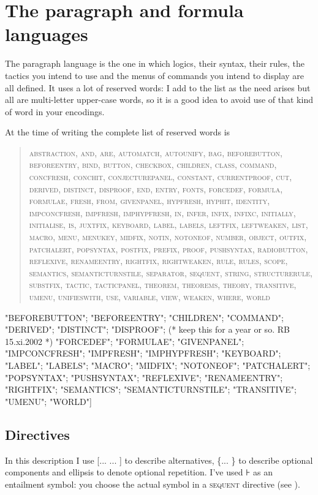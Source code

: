 \chapter{The paragraph and formula languages}
\label{appx:paraformlang}


The paragraph language is the one in which logics, their syntax, their rules, the tactics you intend to use and the menus of commands you intend to display are all defined. It uses a lot of reserved words: I add to the list as the need arises but all are multi-letter upper-case words, so it is a good idea to avoid use of that kind of word in your encodings.

At the time of writing the complete list of reserved words is
\begin{quote}
\textsc{abstraction, and, are, automatch, autounify, bag, beforebutton, beforeentry, bind, button, checkbox, children, class, command, concfresh, conchit, conjecturepanel, constant, currentproof, cut, derived, distinct, disproof, end, entry, fonts, forcedef, formula, formulae, fresh, from, givenpanel, hypfresh, hyphit, identity, impconcfresh, impfresh, imphypfresh, in, infer, infix, infixc, initially, initialise, is, juxtfix, keyboard, label, labels, leftfix, leftweaken, list, macro, menu, menukey, midfix, notin, notoneof, number, object, outfix, patchalert, popsyntax, postfix, prefix, proof, pushsyntax, radiobutton, reflexive, renameentry, rightfix, rightweaken, rule, rules, scope, semantics, semanticturnstile, separator, sequent, string, structurerule, substfix, tactic, tacticpanel, theorem, theorems, theory, transitive, umenu, unifieswith, use, variable, view, weaken, where, world}
\end{quote}

 
     "BEFOREBUTTON"; "BEFOREENTRY";  
     "CHILDREN"; "COMMAND";
     "DERIVED"; "DISTINCT"; "DISPROOF"; (* keep this for a year or so. RB 15.xi.2002 *)
     "FORCEDEF"; "FORMULAE"; 
     "GIVENPANEL"; 
     "IMPCONCFRESH"; "IMPFRESH"; "IMPHYPFRESH";  
     "KEYBOARD"; 
     "LABEL"; "LABELS"; 
     "MACRO"; "MIDFIX"; 
     "NOTONEOF"; 
     "PATCHALERT"; "POPSYNTAX"; "PUSHSYNTAX";
     "REFLEXIVE"; "RENAMEENTRY"; "RIGHTFIX";  
     "SEMANTICS"; "SEMANTICTURNSTILE"; "TRANSITIVE"; 
     "UMENU"; "WORLD"]

\section{Directives}

In this description I use [... {\textbar}... ] to describe alternatives, \{... \} to describe optional components and ellipsis to denote optional repetition. I've used ⊦ as an entailment symbol: you choose the actual symbol in a \textsc{sequent} directive (see ).

